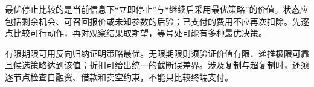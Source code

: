 最优停止比较的是当前信息下“立即停止”与“继续后采用最优策略”的价值。状态应包括剩余机会、可召回报价或未知参数的后验；已支付的费用不应再次扣除。先逐点比较可行动作，再对观察结果取期望，等号处可能有多种最优决策。

有限期限可用反向归纳证明策略最优。无限期限则须验证价值有限、递推极限可靠且候选策略达到该值；折扣可给出统一的截断误差界。涉及复制与超复制时，还须逐节点检查自融资、借款和卖空约束，不能只比较终端支付。
\par\smallskip
